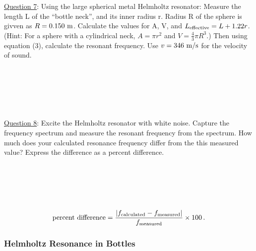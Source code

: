\documentclass[11pt]{NSF}
\def\be{\begin{equation}}
\def\ee{\end{equation}}
\begin{document}
\underline{Question 7}: Using the large spherical metal Helmholtz resonator: Measure the length L of the “bottle neck”, and its inner radius r. Radius R of the sphere is givven as $R=0.150~{\rm m}$. Calculate the values for A, V, and  $L_{\rm effective}=L+1.22 r$. (Hint: For a sphere with a cylindrical neck, $A=\pi r^2$ and $V = \frac{4}{3}\pi R^3$.)
Then using equation (3), calculate the resonant frequency. Use $v=346~{\rm m/s}$ for the 
velocity of sound. 
\\
\\
\\
\\
\\
\\
\\

\underline{Question 8}: Excite the Helmholtz resonator with white noise. Capture the frequency spectrum and measure the resonant frequency from the spectrum. How much does your calculated resonance frequency differ from the this measured value? Express the difference as a percent difference.
\\
\\
\\
\\
\\
\\

\be
\text{percent difference} = 
\frac{|f_{\rm calculated}-f_{\rm measured}|}{f_{\rm measured}} 
\times 100\,.\ee

\subsubsection{Helmholtz Resonance in Bottles}
\end{document}
